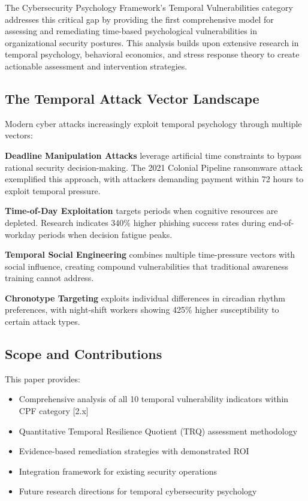\documentclass[11pt,a4paper]{article}
\begin{document}
The Cybersecurity Psychology Framework's Temporal Vulnerabilities category addresses this critical gap by providing the first comprehensive model for assessing and remediating time-based psychological vulnerabilities in organizational security postures. This analysis builds upon extensive research in temporal psychology, behavioral economics, and stress response theory to create actionable assessment and intervention strategies.

\subsection{The Temporal Attack Vector Landscape}

Modern cyber attacks increasingly exploit temporal psychology through multiple vectors:

\textbf{Deadline Manipulation Attacks} leverage artificial time constraints to bypass rational security decision-making. The 2021 Colonial Pipeline ransomware attack exemplified this approach, with attackers demanding payment within 72 hours to exploit temporal pressure.

\textbf{Time-of-Day Exploitation} targets periods when cognitive resources are depleted. Research indicates 340\% higher phishing success rates during end-of-workday periods when decision fatigue peaks.

\textbf{Temporal Social Engineering} combines multiple time-pressure vectors with social influence, creating compound vulnerabilities that traditional awareness training cannot address.

\textbf{Chronotype Targeting} exploits individual differences in circadian rhythm preferences, with night-shift workers showing 425\% higher susceptibility to certain attack types.

\subsection{Scope and Contributions}

This paper provides:
\begin{itemize}
\item Comprehensive analysis of all 10 temporal vulnerability indicators within CPF category [2.x]
\item Quantitative Temporal Resilience Quotient (TRQ) assessment methodology
\item Evidence-based remediation strategies with demonstrated ROI
\item Integration framework for existing security operations
\item Future research directions for temporal cybersecurity psychology
\end{itemize}
\end{document}
